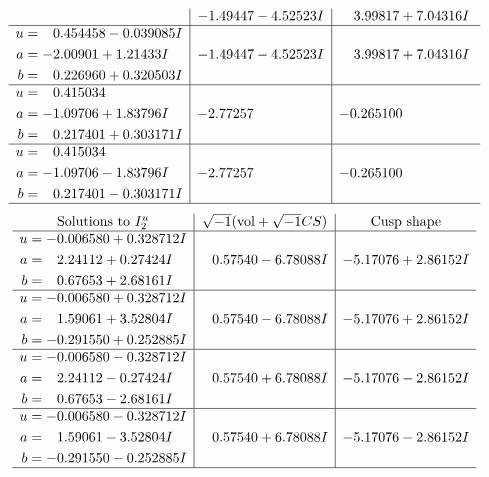 \documentclass[1p]{elsarticle_modified}
\theoremstyle{definition}
\newcommand{\I}{\sqrt{-1}}
\begin{document}
$$\begin{array}{c|c|c}
 & -1.49447 - 4.52523 I & \phantom{-}3.99817 + 7.04316 I \\ \hline\begin{aligned}
u &= \phantom{-}0.454458 - 0.039085 I \\
a &= -2.00901 + 1.21433 I \\
b &= \phantom{-}0.226960 + 0.320503 I\end{aligned}
 & -1.49447 - 4.52523 I & \phantom{-}3.99817 + 7.04316 I \\ \hline\begin{aligned}
u &= \phantom{-}0.415034\phantom{ +0.000000I} \\
a &= -1.09706 + 1.83796 I \\
b &= \phantom{-}0.217401 + 0.303171 I\end{aligned}
 & -2.77257\phantom{ +0.000000I} & -0.265100\phantom{ +0.000000I} \\ \hline\begin{aligned}
u &= \phantom{-}0.415034\phantom{ +0.000000I} \\
a &= -1.09706 - 1.83796 I \\
b &= \phantom{-}0.217401 - 0.303171 I\end{aligned}
 & -2.77257\phantom{ +0.000000I} & -0.265100\phantom{ +0.000000I}\\
 \hline 
 \end{array}$$\newpage$$\begin{array}{c|c|c}  
\text{Solutions to }I^u_{2}& \I (\text{vol} + \sqrt{-1}CS) & \text{Cusp shape}\\
 \hline 
\begin{aligned}
u &= -0.006580 + 0.328712 I \\
a &= \phantom{-}2.24112 + 0.27424 I \\
b &= \phantom{-}0.67653 + 2.68161 I\end{aligned}
 & \phantom{-}0.57540 - 6.78088 I & -5.17076 + 2.86152 I \\ \hline\begin{aligned}
u &= -0.006580 + 0.328712 I \\
a &= \phantom{-}1.59061 + 3.52804 I \\
b &= -0.291550 + 0.252885 I\end{aligned}
 & \phantom{-}0.57540 - 6.78088 I & -5.17076 + 2.86152 I \\ \hline\begin{aligned}
u &= -0.006580 - 0.328712 I \\
a &= \phantom{-}2.24112 - 0.27424 I \\
b &= \phantom{-}0.67653 - 2.68161 I\end{aligned}
 & \phantom{-}0.57540 + 6.78088 I & -5.17076 - 2.86152 I \\ \hline\begin{aligned}
u &= -0.006580 - 0.328712 I \\
a &= \phantom{-}1.59061 - 3.52804 I \\
b &= -0.291550 - 0.252885 I\end{aligned}
 & \phantom{-}0.57540 + 6.78088 I & -5.17076 - 2.86152 I\\
 \hline 
 \end{array}$$\newpage\newpage\renewcommand{\arraystretch}{1}
\end{document}
